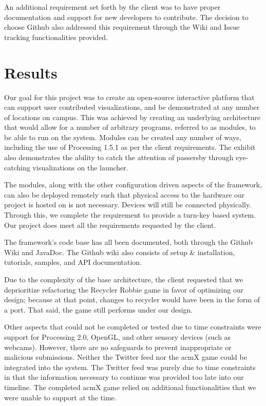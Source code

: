 \documentclass[11pt,letterpaper]{article}
\begin{document}
	An additional requirement set forth by the client was to have proper 
	documentation and support for new developers to contribute. The decision 
	to choose Github also addressed this requirement through the Wiki and 
	Issue tracking functionalities provided.

	\pagebreak
   
	\section{Results}
	Our goal for this project was to create an open-source interactive 
	platform that can support user contributed visualizations, and be 
	demonstrated at any number of locations on campus. This was achieved by 
	creating an underlying architecture that would allow for a number of 
	arbitrary programs, referred to as modules, to be able to run on the system. 
	Modules can be created any number of ways, including the use of 
	Processing 1.5.1 as per the client requirements. The exhibit also 
	demonstrates the ability to catch the attention of passersby through eye-
	catching visualizations on the launcher.

	The modules, along with the other configuration driven aspects of the 
	framework, can also be deployed remotely such that physical access to the 
	hardware our project is hosted on is not necessary. Devices will still be 
	connected physically. Through this, we complete the requirement to provide 
	a turn-key based system. Our project does meet all the requirements 
	requested by the client. 

	The framework's code base has all been documented, both through the Github 
	Wiki and JavaDoc. The Github wiki also consists of setup \& installation, 
	tutorials, samples, and API documentation.

	Due to the complexity of the base architecture, the client requested that 
	we deprioritize refactoring the Recycler Robbie game in favor of 
	optimizing our design; because at that point, changes to recycler would 
	have been in the form of a port. That said, the game still performs under 
	our design. 

	Other aspects that could not be completed or tested due to time 
	constraints were support for Processing 2.0, OpenGL, and other sensory 
	devices (such as webcams). However, there are no safeguards to prevent 
	inappropriate or malicious submissions. Neither the Twitter feed nor the 
	acmX game could be integrated into the system. The Twitter feed was purely 
	due to time constraints in that the information necessary to continue was 
	provided too late into our timeline. The completed acmX game relied on 
	additional functionalities that we were unable to support at the time.
\end{document}
